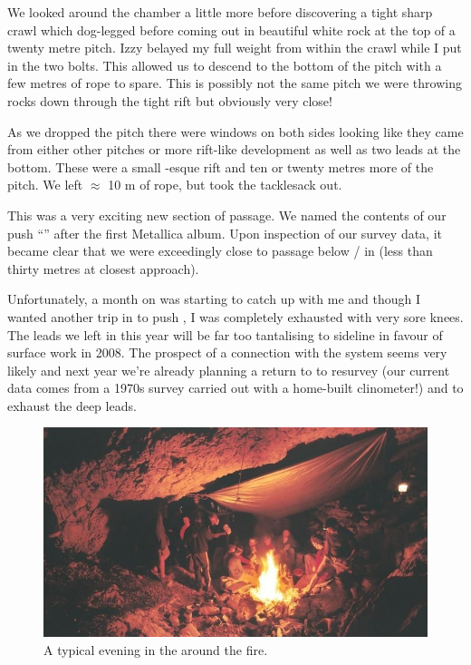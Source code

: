We looked around the chamber a little more before discovering a tight
sharp crawl which dog-legged before coming out in beautiful white rock
at the top of a twenty metre pitch. Izzy belayed my full weight from
within the crawl while I put in the two bolts. This allowed us to
descend to the bottom of the pitch with a few metres of rope to spare.
This is possibly not the same pitch we were throwing rocks down through
the tight rift but obviously very close!

As we dropped the pitch there were windows on both sides looking like
they came from either other pitches or more rift-like development as
well as two leads at the bottom. These were a small -esque rift and ten or twenty metres more of the pitch. We left
$\approx$ 10 m of rope, but took the tacklesack out.

This was a very exciting new section of passage. We named the contents
of our push ``'' after the first Metallica album. Upon
inspection of our survey data, it became clear that we were exceedingly
close to passage below / in  (less than thirty
metres at closest approach).

Unfortunately, a month on  was starting to catch up with me and
though I wanted another trip in  to push , I
was completely exhausted with very sore knees. The leads we left in
 this year will be far too tantalising to sideline in favour of
surface work in 2008. The prospect of a connection with the system seems
very likely and next year we're already planning a return to 
to resurvey (our current data comes from a 1970s survey carried out with
a home-built clinometer!) and to exhaust the deep leads.


\begin{figure}
\checkoddpage \ifoddpage \forcerectofloat \else \forceversofloat \fi
   \centering
\includegraphics[width = \textwidth]{2007/kangaroo/jarvist frost gr1 film2 -031_28.jpg}
\caption{A typical evening in the \protect{} around the fire. }
\end{figure}


